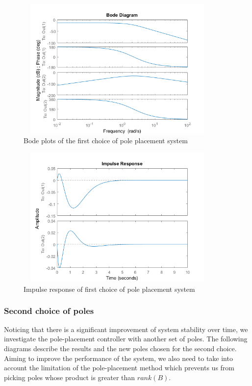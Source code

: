 \documentclass [12pt,letterpaper]{exam}
\newcounter{count}
\begin{document}
\begin{figure}[H]
  \centering
    \includegraphics[width=10.15cm, height=7cm]{pl_bode} 
  \caption{Bode plots of the first choice of pole placement system}
  \label{fig:pl_bode}
\end{figure}

\begin{figure}[H]
  \centering
    \includegraphics[width=10.15cm, height=7cm]{pl_impulse} 
  \caption{Impulse response of first choice of pole placement system}
  \label{fig:pl_impulse}
\end{figure}



\subsubsection{Second choice of poles}
Noticing that there is a significant improvement of system stability over time, we investigate the pole-placement controller with another set of poles. The following diagrams describe the results and the new poles chosen for the second choice. Aiming to improve the performance of the system, we also need to take into account the limitation of the pole-placement method which prevents us from picking poles whose product is greater than $rank(B)$.
\end{document}
